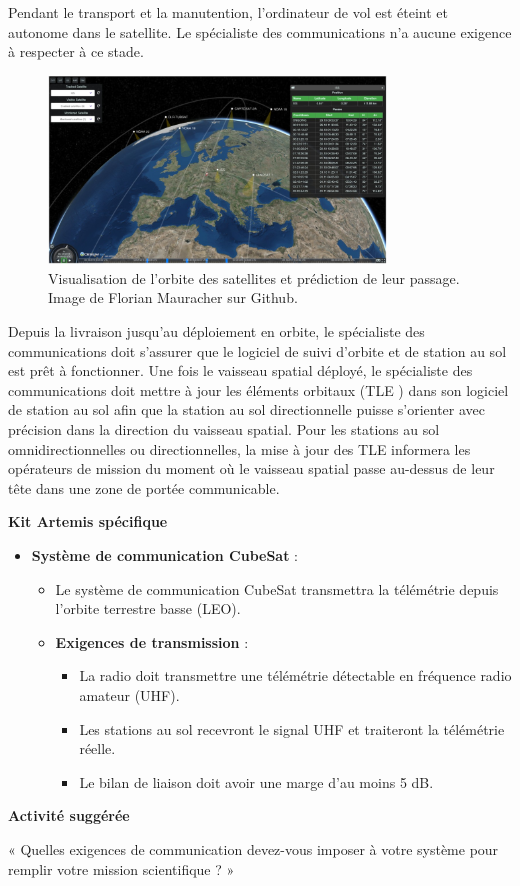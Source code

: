 Pendant le transport et la manutention, l'ordinateur de vol est éteint et autonome dans le satellite. Le spécialiste des communications n'a aucune exigence à respecter à ce stade.
\begin{figure}[H] %
    \centering
    \includegraphics[width=0.8\textwidth]{figures/6-12.jpg}
    
    \caption{Visualisation de l'orbite des satellites et prédiction de leur passage. Image de Florian Mauracher sur Github.}
    \label{fig:communication2}
\end{figure}
Depuis la livraison jusqu'au déploiement en orbite, le spécialiste des communications doit s'assurer que le logiciel de suivi d'orbite et de station au sol est prêt à fonctionner. Une fois le vaisseau spatial déployé, le spécialiste des communications doit mettre à jour les éléments orbitaux (TLE ) dans son logiciel de station au sol afin que la station au sol directionnelle puisse s'orienter avec précision dans la direction du vaisseau spatial. Pour les stations au sol omnidirectionnelles ou directionnelles, la mise à jour des TLE informera les opérateurs de mission du moment où le vaisseau spatial passe au-dessus de leur tête dans une zone de portée communicable.
\begin{center}
    \textbf{Kit Artemis spécifique}
\end{center}
\begin{itemize}
    \item \textbf{Système de communication CubeSat} :
    \begin{itemize}
        \item Le système de communication CubeSat transmettra la télémétrie depuis l'orbite terrestre basse (LEO).
        \item \textbf{Exigences de transmission} :
        \begin{itemize}
            \item La radio doit transmettre une télémétrie détectable en fréquence radio amateur (UHF).
            \item Les stations au sol recevront le signal UHF et traiteront la télémétrie réelle.
            \item Le bilan de liaison doit avoir une marge d'au moins 5 dB.
        \end{itemize}
    \end{itemize}
\end{itemize}
\begin{center}
    \textbf{Activité suggérée}
\end{center}
« Quelles exigences de communication devez-vous imposer à votre système pour remplir votre mission scientifique ? »
 




